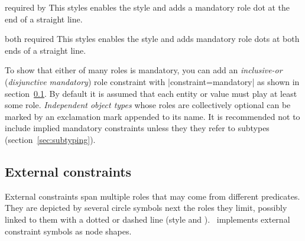 \documentclass[a4paper,10pt]{article}
\begin{document}
\begin{stylekey}{required by}
This styles enables the  style and adds a mandatory role dot at the end of a straight line.
\begin{codeexample}[]
\end{codeexample}
\end{stylekey}

\begin{stylekey}{both required}
This styles enables the  style and adds mandatory role dots at both ends of a straight line.
\begin{codeexample}[]
\end{codeexample}
\end{stylekey}

\noindent To show that either of many roles is mandatory, you can add an \emph{inclusive-or} (\emph{disjunctive mandatory}) role constraint with |constraint=mandatory| as shown in section~\ref{sec:externalconstraints}. By default it is assumed that each entity or value must play at least some role. \emph{Independent object types} whose roles are collectively optional can be marked by an exclamation mark appended to its name. It is recommended not to include implied mandatory constraints unless they they refer to subtypes (section~\ref{sec:subtyping}).


\subsection{External constraints}
\label{sec:externalconstraints}
External constraints span multiple roles that may come from different predicates. They are depicted by several circle symbols next the roles they limit, possibly linked to them with a dotted or dashed line (style  and ). \tkzorm\ implements external constraint symbols as node shapes.
\end{document}

